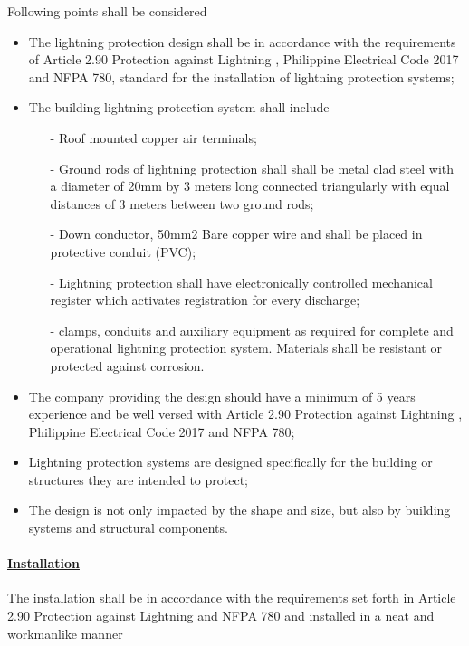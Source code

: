 Following points shall be considered
\begin{itemize}
\item The lightning protection design shall be in accordance with the requirements of Article 2.90 Protection against Lightning , Philippine Electrical Code 2017 and NFPA 780, standard for the installation of lightning protection systems;

\item The building lightning protection system shall include

\begin{itemize}
\item[-] Roof mounted copper air terminals;
\item[-]	Ground rods of lightning protection shall shall be metal clad steel with a diameter of 20mm by 3 meters long connected triangularly with equal distances of 3 meters between two ground rods;
\item[-]	Down conductor, 50mm2 Bare copper wire and shall be placed in protective conduit (PVC);
\item[-]	Lightning protection shall have electronically controlled mechanical register which activates registration for every discharge;
\item[-]	clamps, conduits and auxiliary equipment as required for complete and operational lightning protection system. Materials shall be resistant or protected against  corrosion.

\end{itemize}

\item The company providing the design should have a minimum of 5 years experience and be well versed with Article 2.90 Protection against Lightning , Philippine Electrical Code 2017 and NFPA 780;
\item 	Lightning protection systems are designed specifically for the building or structures they are intended to protect;
\item 	The design is not only impacted by the shape and size, but also by building systems and structural components.

\end{itemize}

\paragraph{\underline{Installation}}
The installation shall be in accordance with the requirements set forth in Article 2.90 Protection against Lightning and NFPA 780 and installed in a neat and workmanlike manner


